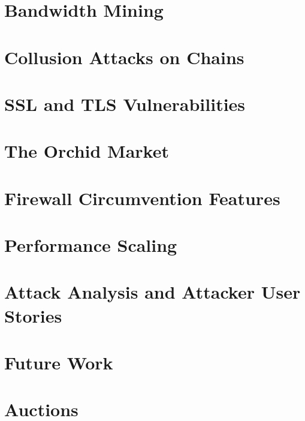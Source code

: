 \documentclass{article}
\newcommand{\orchid}{Orchid}
\newcommand{\Orchid}{\orchid}
\newcommand{\TOM}{The \Orchid{} Market}
\begin{document}
\section{Bandwidth Mining}
\label{sec:mining}


\section{Collusion Attacks on Chains}
\label{sec:collusion-attacks}


\section{SSL and TLS Vulnerabilities}


\section{\TOM{}}
\label{sec:agora}


\section{Firewall Circumvention Features}
\label{sec:evasion}



\section{Performance Scaling}
\label{sec:performance}


\section{Attack Analysis and Attacker User Stories}
\label{sec:attack-stories}


\section{Future Work}
\label{sec:future}


\newpage

\printbibliography

\newpage

\appendix

\section{Auctions}
\label{sec:auctions}

\end{document}
